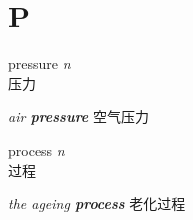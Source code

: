 \section{P}

\item[] {
    \lettrine{pressure}{}  
    \textit{n} 
    \\
    压力

    \textit{air \textbf{pressure}}
    空气压力

}

\item[] {
    \lettrine{process}{}  
    \textit{n} 
    \\
    过程

    \textit{the ageing \textbf{process}}
    老化过程

}